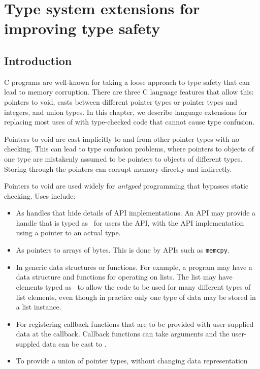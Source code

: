 
\chapter{Type system extensions for improving type safety}

\section{Introduction}

C programs are well-known for taking a loose approach to type safety that
can lead to memory corruption.   There are three C language features that
allow this: pointers to void, casts between different pointer types or
pointer types and integers, and union types.  In this chapter, 
we describe language extensions for replacing  most uses of \uncheckedptrvoid{}
with type-checked code that cannot cause type confusion.

Pointers to void are cast implicitly to and from other pointer types with no checking.
This can lead to type confusion problems, where pointers to objects of one type are mistakenly
assumed to be pointers to objects of different types.  Storing through the pointers
can corrupt memory directly and indirectly.

Pointers to void are used widely for {\em untyped} programming that bypasses
static checking.  Uses include:
\begin{itemize}
\item As handles that hide details of API implementations.  An
API may provide a handle that is typed as \uncheckedptrvoid\ for 
users the API, with the API implementation using a pointer to an actual
type.
\item As pointers to arrays of bytes.  This is done by APIs such as \lstinline+memcpy+.
\item In generic data structures or functions. For example, 
a program may have a data structure and functions for operating on lists. 
The list may  have elements typed as \uncheckedptrvoid\ to allow the code
to be used for many different types of list elements, 
even though in practice only one type of data may be stored in a list instance. 
\item For registering callback functions that are to be provided with 
user-supplied data at the callback.  Callback functions can take \uncheckedptrvoid{} arguments and 
the user-suppled data can be cast to \uncheckedptrvoid{}.
\item To provide a union of pointer types, without changing data representation
\end{itemize}

